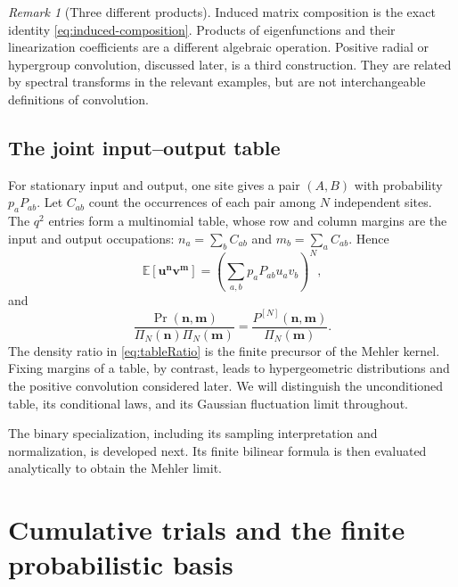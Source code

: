 \documentclass[11pt,reqno]{amsart}
\theoremstyle{definition}
\theoremstyle{remark}
\newtheorem{remark}[theorem]{Remark}
\begin{document}
\begin{remark}[Three different products]
Induced matrix composition is the exact identity
\eqref{eq:induced-composition}. Products of eigenfunctions and their
linearization coefficients are a different algebraic operation.
Positive radial or hypergroup convolution, discussed later, is a third
construction. They are related by spectral transforms in the relevant
examples, but are not interchangeable definitions of convolution.
\end{remark}

\subsection{The joint input--output table}
For stationary input and output, one site gives a pair $(A,B)$ with
probability $p_aP_{ab}$. Let $C_{ab}$ count the occurrences of each pair
among $N$ independent sites. The $q^2$ entries form a multinomial table,
whose row and column margins are the input and output occupations:
$n_a=\sum_bC_{ab}$ and $m_b=\sum_aC_{ab}$. Hence
\begin{equation}\label{eq:tableGF}
\mathbb E[\mathbf u^{\mathbf n}\mathbf v^{\mathbf m}]
=\left(\sum_{a,b}p_aP_{ab}u_av_b\right)^N,
\end{equation}
and
\begin{equation}\label{eq:tableRatio}
\frac{\Pr(\mathbf n,\mathbf m)}{\Pi_N(\mathbf n)\Pi_N(\mathbf m)}
=\frac{P^{[N]}(\mathbf n,\mathbf m)}{\Pi_N(\mathbf m)}.
\end{equation}
The density ratio in \eqref{eq:tableRatio} is the finite precursor of
the Mehler kernel. Fixing margins of a table, by contrast, leads to
hypergeometric distributions and the positive convolution considered
later. We will distinguish the unconditioned table, its conditional
laws, and its Gaussian fluctuation limit throughout.

The binary specialization, including its sampling interpretation and
normalization, is developed next. Its finite bilinear formula is then
evaluated analytically to obtain the Mehler limit.

\section{Cumulative trials and the finite probabilistic basis}\label{L:cumulative}
\end{document}
